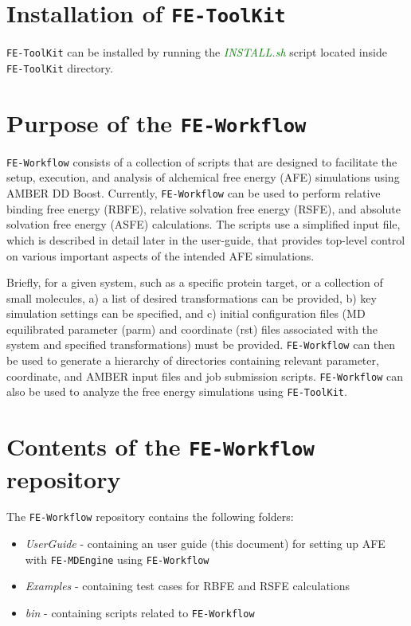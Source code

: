 \documentclass[11pt,letterpaper,titlepage]{article}
\newcommand{\addb}{\texttt{FE-MDEngine}}
\newcommand{\tk}{\texttt{FE-ToolKit}}
\newcommand{\wf}{\texttt{FE-Workflow}}
\begin{document}
\vspace{0.1cm}
\section{Installation of \tk{}}
\vspace{0.1cm}

\tk{} can be installed by running the \textcolor{green}{\textit{INSTALL.sh}}
script located inside \tk{} directory.

\vspace{0.1cm}
\section{Purpose of the \wf{}}
\vspace{0.1cm}

\wf{} consists of a collection of scripts that are designed to 
facilitate the setup, execution, and analysis of alchemical 
free energy (AFE) simulations using AMBER DD Boost. Currently, 
\wf{} can be used to perform relative binding
free energy (RBFE), relative solvation free energy (RSFE), and 
absolute solvation free energy (ASFE) calculations. The scripts
use a
simplified input file, which is described in detail later in the 
user-guide, that provides top-level control on various important 
aspects of the intended AFE simulations. 

Briefly, for a given system, such as a specific protein target, or 
a collection of small molecules, 
a) a list of desired transformations can be provided, 
b) key simulation settings can be specified, and 
c) initial configuration files (MD equilibrated parameter (parm) and 
coordinate (rst) files associated with the system and
specified transformations) must be provided. 
\wf{} can then be used to generate a hierarchy of directories 
containing relevant parameter, coordinate, and AMBER input files 
and job submission scripts. 
\wf{} can also be used 
to analyze the free energy simulations using \tk{}.


\vspace{0.1cm}
\section{Contents of the \wf{} repository}
\vspace{0.1cm}

The \wf{} repository contains the following folders:
\begin{itemize}
	\item{\textit{UserGuide} - containing an user guide (this document) 
		for setting up AFE with \addb{} using \wf{}}
        \item{\textit{Examples} - containing test cases for RBFE and 
		RSFE calculations}
	\item{\textit{bin} - containing scripts related to \wf{}}
\end{itemize}
\end{document}
